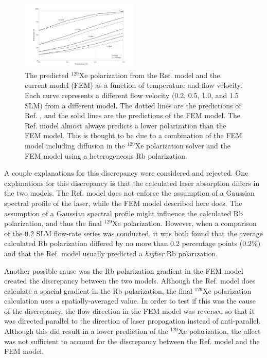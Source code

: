 \begin{figure}
    \centering
    \includegraphics[width=0.5\textwidth]{Figures/FEM_vs_Freeman.png}
    \caption{The predicted $^{129}$Xe polarization from the Ref. \cite{Freeman2014} model and the current model (FEM) as a function of temperature and flow velocity. Each curve represents a different flow velocity (0.2, 0.5, 1.0, and 1.5 SLM) from a different model. The dotted lines are the predictions of Ref. \cite{Freeman2014}, and the solid lines are the predictions of the FEM model. The Ref. \cite{Freeman2014} model almost always predicts a lower polarization than the FEM model. This is thought to be due to a combination of the FEM model including diffusion in the $^{129}$Xe polarization solver and the FEM model using a heterogeneous Rb polarization.}
    \label{fig:modelcomparison}
\end{figure}

A couple explanations for this discrepancy were considered and rejected. One explanations for this discrepancy is that the calculated laser absorption differs in the two models. The Ref. \cite{Freeman2014} model does not enforce the assumption of a Gaussian spectral profile of the laser, while the FEM model described here does. The assumption of a Gaussian spectral profile might influence the calculated Rb polarization, and thus the final $^{129}$Xe polarization. However, when a comparison of the 0.2 SLM flow-rate series was conducted, it was both found that the average calculated Rb polarization differed by no more than 0.2 percentage points (0.2\%) and that the Ref. \cite{Freeman2014} model usually predicted a \textit{higher} Rb polarization. 

Another possible cause was the Rb polarization gradient in the FEM model created the discrepancy between the two models. Although the Ref. \cite{Freeman2014} model does calculate a spacial gradient in the Rb polarization, the final $^{129}$Xe polarization calculation uses a spatially-averaged value. In order to test if this was the cause of the discrepancy, the  flow direction in the FEM model was reversed so that it was directed parallel to the direction of laser propagation instead of anti-parallel. Although this did result in a  lower prediction of the $^{129}$Xe polarization, the affect was not sufficient to account for the discrepancy between the Ref. \cite{Freeman2014} model and the FEM model. 

